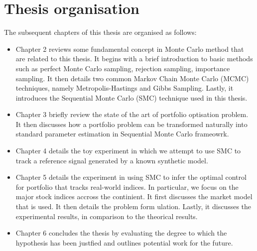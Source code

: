 \section{Thesis organisation}
The subsequent chapters of this thesis are organised as follows:
\begin{itemize}
\item Chapter 2 reviews some fundamental concept in Monte Carlo method that are related to this thesis. It begins with a brief introduction to basic methods such as perfect Monte Carlo sampling, rejection sampling, importance sampling. It then details two common Markov Chain Monte Carlo (MCMC) techniques, namely Metropolis-Hastings and Gibbs Sampling. Lastly, it introduces the Sequential Monte Carlo (SMC)  technique used in this thesis.
\item Chapter 3 briefly review the state of the art of portfolio optisation problem. It then discusses how a portfolio problem can be transformed naturally into standard parameter estimation in Sequential Monte Carlo frameowrk.
\item Chapter 4 details the toy experiment in which we attempt to use SMC to track a reference signal generated by a known synthetic model. 
\item Chapter 5 details the experiment in using SMC to infer the optimal control for portfolio that tracks real-world indices. In particular, we focus on the major stock indices accross the continient. It first discusses the market model that is used. It then details the problem form
ulation. Lastly, it discusses the experimental results, in comparison to the theorical results.
\item Chapter 6 concludes the thesis by evaluating the degree to which the hypothesis has been justfied and outlines potential work for the future.
\end{itemize}



